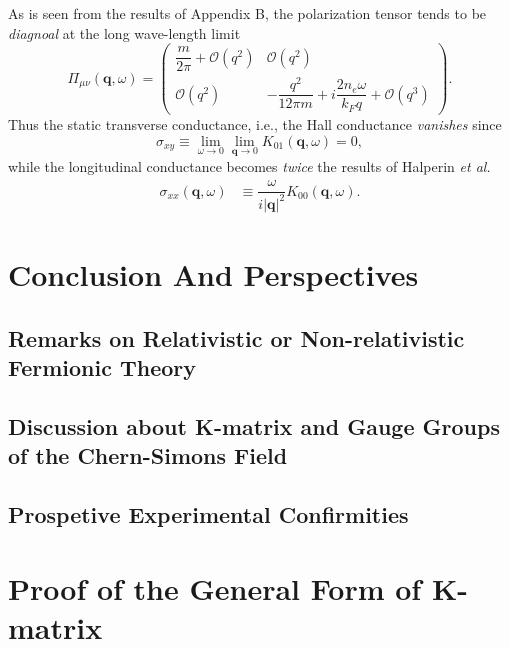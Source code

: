 \documentclass[bachelor,english,numbers]{ustcthesis}
\begin{document}
		As is seen from the results of Appendix B, the polarization tensor tends to be \emph{diagnoal} at the long wave-length limit
		\begin{equation}\label{2.5.5}
			\Pi_{\mu\nu}(\bm{q},\omega)=\left(\begin{array}{cc}
				\dfrac{m}{2\pi}+\mathcal{O}(q^2) & \mathcal{O}(q^2) \\
				\mathcal{O}(q^2) & -\dfrac{q^2}{12\pi m}+i\dfrac{2n_e\omega}{k_F q}+\mathcal{O}(q^3)
			\end{array}\right).
		\end{equation}
		Thus the static transverse conductance, i.e., the Hall conductance \emph{vanishes} since
		\begin{equation}
			\sigma_{xy}\equiv\lim_{\omega\rightarrow0}\lim_{\bm{q}\rightarrow0}K_{01}(\bm{q},\omega)=0,\label{2.5.6}
		\end{equation}
		while the longitudinal conductance becomes \emph{twice} the results of Halperin {\it et al.} \cite{Halperin1995Theory}
		\begin{align}
			\sigma_{xx}(\bm{q},\omega)&\equiv\dfrac{\omega}{i|\bm{q}|^2}K_{00}(\bm{q},\omega).
		\end{align}

\chapter{Conclusion And Perspectives}
	\section{Remarks on Relativistic or Non-relativistic Fermionic Theory}
	\section{Discussion about K-matrix and Gauge Groups of the Chern-Simons Field}
	\section{Prospetive Experimental Confirmities}

\appendix
\chapter{Proof of the General Form of K-matrix}
\end{document}
